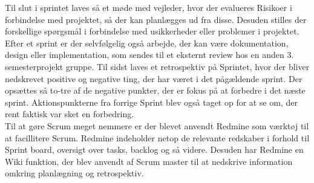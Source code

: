 \documentclass[Rapport/Rapport_main.tex]{subfiles}
\begin{document}
Til slut i sprintet laves så et møde med vejleder, hvor der evalueres Risikoer i forbindelse med projektet, så der kan planlægges ud fra disse. Desuden stilles der forskellige spørgsmål i forbindelse med usikkerheder eller problemer i projektet. Efter et sprint er der selvfølgelig også arbejde, der kan være dokumentation, design eller implementation, som sendes til et eksternt review hos en anden 3. semesterprojekt gruppe. Til sidst laves et retrospektiv på Sprintet, hvor der bliver nedskrevet positive og negative ting, der har været i det pågældende sprint. Der opsættes så to-tre af de negative punkter, der er fokus på at forbedre i det næste sprint. Aktionspunkterne fra forrige Sprint blev også taget op for at se om, der rent faktisk var sket en forbedring.\\
Til at gøre Scrum meget nemmere er der blevet anvendt Redmine som værktøj til at facillitere Scrum. Redmine indeholder netop de relevante redskaber i forhold til Sprint board, oversigt over tasks, backlog og så videre. Desuden har Redmine en Wiki funktion, der blev anvendt af Scrum master til at nedskrive information omkring planlægning og retrospektiv.
\end{document}
